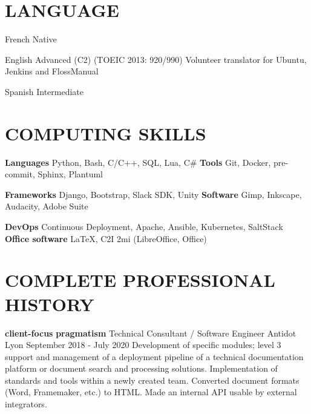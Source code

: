 \documentclass[11pt,a4paper]{moderncv}
\begin{document}


    \section{LANGUAGE}\label{sec:language}

  \cvlanguage
    {French}
    {Native}{}{}{}{}

  \cvlanguage
    {English}
    {Advanced (C2) (TOEIC 2013: 920/990)}
    {Volunteer translator for Ubuntu, Jenkins and FlossManual}

  \cvlanguage
    {Spanish}
    {Intermediate}
    {}{}{}{}

  \section{COMPUTING SKILLS}\label{sec:computing-skills}

  \cvcomputer
    {\textbf{Languages}}
    {Python, Bash, C/C++, SQL, Lua, C\#}
    {\textbf{Tools}}
    {Git, Docker, pre-commit, Sphinx, Plantuml}

  \cvcomputer
    {\textbf{Frameworks}}
    {Django, Bootstrap, Slack SDK, Unity}
    {\textbf{Software}}
    {Gimp, Inkscape, Audacity, Adobe Suite}

  \cvcomputer
    {\textbf{DevOps}}
    {Continuous Deployment, Apache, Ansible, Kubernetes, SaltStack}
    {\textbf{Office software}}
    {\LaTeX{}, C2I 2mi (LibreOffice, Office)}

  \newpage

    \section{COMPLETE PROFESSIONAL HISTORY}\label{sec:complete-professional-history}

  \cventry
    {\textbf{client-focus} \textbf{pragmatism}}
    {Technical Consultant / Software Engineer}
    {Antidot}
    {Lyon}
    {September 2018 - July 2020}{
        Development of specific modules; level 3 support and management of a deployment pipeline
        of a technical documentation platform or document search and processing solutions. Implementation
        of standards and tools within a newly created team. Converted document
        formats (Word, Framemaker, etc.) to HTML. Made an internal API usable by external integrators.
    }
\end{document}
